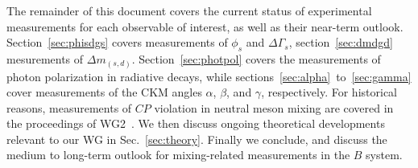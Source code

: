 The remainder of this document covers the current status of experimental measurements for each observable of
interest, as well as their near-term outlook. Section~\ref{sec:phisdgs} covers measurements of $\phi_s$ and $\Delta\Gamma_s$, section~\ref{sec:dmdgd} 
mesurements of $\Delta m_{(s,d)}$. Section~\ref{sec:photpol} covers the measurements of photon polarization in radiative decays, while
sections~\ref{sec:alpha}~to~\ref{sec:gamma} cover measurements of the CKM angles $\alpha$, $\beta$, and $\gamma$, respectively.
For historical reasons, measurements of $CP$ violation in neutral meson mixing are covered in the proceedings of WG2~\cite{WG2PROC}. We then discuss
ongoing theoretical developments relevant to our WG in Sec.~\ref{sec:theory}. Finally we conclude,
and discuss the medium to long-term outlook for mixing-related measurements in the $B$ system.



